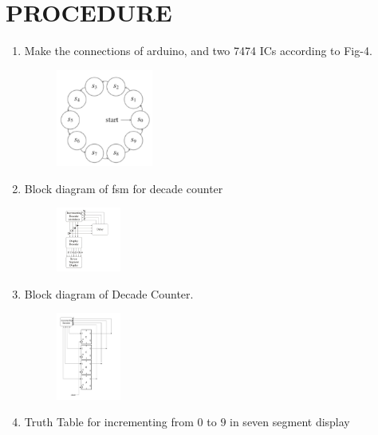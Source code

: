 \documentclass[conference]{IEEEtran}
\begin{document}
\section{PROCEDURE}


\begin{enumerate}

\item Make the connections of arduino, and two 7474 ICs according to Fig-4.
	\begin{figure}[h] 
	\centering 
	\includegraphics[width=0.3\textwidth]{IMG-20241126-WA0009.jpg     }
	\caption{\label{fig-4:Gates}}    
\end{figure}

\item Block diagram of fsm for decade counter
\begin{figure}[h]                           
\centering                                 
\includegraphics[width=0.2\textwidth]{IMG-20241126-WA0006.jpg  }                                           
\caption{\label{fig-5:Gates}}               
\end{figure}



\item Block diagram of Decade Counter.

\begin{figure}[h]                           
\centering                                 
\includegraphics[width=0.2\textwidth]{fig6.jpg}                                           
\caption{\label{fig-5:Gates}}               
\end{figure}
\item {Truth Table for incrementing from $0$ to $9$ in seven segment display }
	\vspace{0.4cm}


\end{enumerate}
\end{document}
